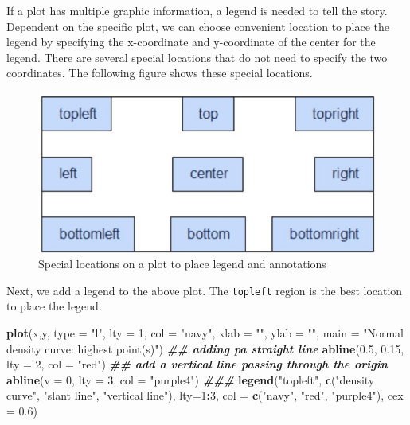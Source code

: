 \documentclass[
]{book}
\newenvironment{Shaded}{\begin{snugshade}}{\end{snugshade}}
\newcommand{\AttributeTok}[1]{\textcolor[rgb]{0.13,0.29,0.53}{#1}}
\newcommand{\DecValTok}[1]{\textcolor[rgb]{0.00,0.00,0.81}{#1}}
\newcommand{\DocumentationTok}[1]{\textcolor[rgb]{0.56,0.35,0.01}{\textbf{\textit{#1}}}}
\newcommand{\FloatTok}[1]{\textcolor[rgb]{0.00,0.00,0.81}{#1}}
\newcommand{\FunctionTok}[1]{\textcolor[rgb]{0.13,0.29,0.53}{\textbf{#1}}}
\newcommand{\NormalTok}[1]{#1}
\newcommand{\SpecialCharTok}[1]{\textcolor[rgb]{0.81,0.36,0.00}{\textbf{#1}}}
\newcommand{\StringTok}[1]{\textcolor[rgb]{0.31,0.60,0.02}{#1}}
\begin{document}
If a plot has multiple graphic information, a legend is needed to tell the story. Dependent on the specific plot, we can choose convenient location to place the legend by specifying the x-coordinate and y-coordinate of the center for the legend. There are several special locations that do not need to specify the two coordinates. The following figure shows these special locations.

\begin{figure}

{\centering \includegraphics[width=0.55\linewidth]{img01/w01-legendLocations} 

}

\caption{Special locations on a plot to place legend and annotations}\label{fig:unnamed-chunk-16}
\end{figure}

Next, we add a legend to the above plot. The \texttt{topleft} region is the best location to place the legend.

\begin{Shaded}
\begin{Highlighting}[]
\FunctionTok{plot}\NormalTok{(x,y, }\AttributeTok{type =} \StringTok{"l"}\NormalTok{, }\AttributeTok{lty =} \DecValTok{1}\NormalTok{, }\AttributeTok{col =} \StringTok{"navy"}\NormalTok{, }\AttributeTok{xlab =} \StringTok{""}\NormalTok{, }\AttributeTok{ylab =} \StringTok{""}\NormalTok{,}
     \AttributeTok{main =} \StringTok{"Normal density curve: highest point(s)"}\NormalTok{)}
\DocumentationTok{\#\# adding pa straight line}
\FunctionTok{abline}\NormalTok{(}\FloatTok{0.5}\NormalTok{, }\FloatTok{0.15}\NormalTok{, }\AttributeTok{lty =} \DecValTok{2}\NormalTok{, }\AttributeTok{col =} \StringTok{"red"}\NormalTok{)}
\DocumentationTok{\#\# add a vertical line passing through the origin}
\FunctionTok{abline}\NormalTok{(}\AttributeTok{v =} \DecValTok{0}\NormalTok{, }\AttributeTok{lty =} \DecValTok{3}\NormalTok{, }\AttributeTok{col =} \StringTok{"purple4"}\NormalTok{)}
\DocumentationTok{\#\#\#}
\FunctionTok{legend}\NormalTok{(}\StringTok{"topleft"}\NormalTok{, }\FunctionTok{c}\NormalTok{(}\StringTok{"density curve"}\NormalTok{, }\StringTok{"slant line"}\NormalTok{, }\StringTok{"vertical line"}\NormalTok{), }\AttributeTok{lty=}\DecValTok{1}\SpecialCharTok{:}\DecValTok{3}\NormalTok{, }\AttributeTok{col =} \FunctionTok{c}\NormalTok{(}\StringTok{"navy"}\NormalTok{, }\StringTok{"red"}\NormalTok{, }\StringTok{"purple4"}\NormalTok{), }\AttributeTok{cex =} \FloatTok{0.6}\NormalTok{)}
\end{Highlighting}
\end{Shaded}
\end{document}
